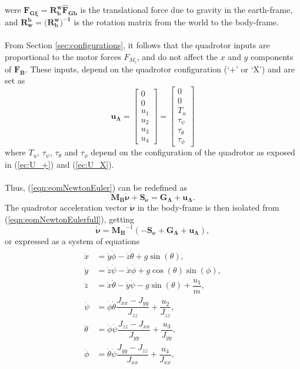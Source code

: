 were $\mathbf{F_{G\xi}}=\mathbf{R_{b}^{w}}\mathbf{\hat{F}_{Gb}}$ is the translational force due to  gravity in the earth-frame, and $\mathbf{R_{w}^{b}} = (\mathbf{R_{b}^{w})^{-1}}$ is the rotation matrix from the world to the body-frame.
\\\\
From Section \ref{sec:configurations}, it follows that the quadrotor inputs are proportional to the motor forces $F_{M_i}$, and do not affect the $x$ and $y$ components of $\mathbf{F_B}$. These inputs, depend on the quadrotor configuration (`+' or `X') and are set as
\begin{equation}
\mathbf{u_{\Lambda}} = \begin{bmatrix}
0 \\[5pt] 0 \\[5pt] u_1 \\[5pt] u_2 \\[5pt] u_3 \\[5pt] u_4
\end{bmatrix} = \begin{bmatrix}
0 \\[5pt] 0 \\[5pt] T_u\\[5pt]
	\tau_{\psi}\\[5pt]
	\tau_{\theta}\\[5pt]
	\tau_{\phi}
\end{bmatrix}
\end{equation}
where $T_u$, $\tau_\psi$, $\tau_\theta$ and $\tau_\phi$ depend on the configuration of the quadrotor as exposed in (\ref{ec:U_+}) and (\ref{ec:U_X}).
\\\\
Thus, (\ref{eqn:eomNewtonEuler}) can be redefined as
\begin{equation}
\label{eqn:eomNewtonEulerfull}
\mathbf{M_{B}}\mathbf{\dot{\nu}} + \mathbf{S_\nu} = \mathbf{G_{\Lambda}} + \mathbf{u_{\Lambda}}.
\end{equation}
The quadrotor acceleration vector $\mathbf{\dot{\nu}}$ in the body-frame is then isolated from (\ref{eqn:eomNewtonEulerfull}), getting
\begin{equation}
\mathbf{\dot{\nu}} = \mathbf{M_{B}}^{-1}(-\mathbf{S_\nu} + \mathbf{G_{\Lambda}} + \mathbf{u_{\Lambda}}),
\end{equation}
or expressed as a system of equations
\begin{align}
\begin{split}
\ddot{x} & = \dot{y} \dot{\phi} - \dot{z} \dot{\theta} + g \sin(\theta), \\[5pt]
\ddot{y} & = \dot{z} \dot{\psi} - \dot{x} \dot{\phi} + g \cos(\theta)\sin(\phi), \\[5pt]
\ddot{z} & = \dot{x} \dot{\theta} - \dot{y} \dot{\psi} - g \sin(\theta) + \dfrac{u_{1}}{m}, \\[5pt]
\ddot{\psi} & = \dot{\phi}\dot{\theta} \dfrac{J_{xx}-J_{yy}}{J_{zz}} + \dfrac{u_{2}}{J_{zz}}, \\[5pt]
\ddot{\theta} & = \dot{\phi} \dot{\psi}\dfrac{J_{zz}-J_{xx}}{J_{yy}} + \dfrac{u_{3}}{J_{yy}}, \\[5pt]
\ddot{\phi} & =  \dot{\theta}\dot{\psi}\dfrac{J_{yy}-J_{zz}}{J_{xx}} + \dfrac{u_{4}}{J_{xx}},
\end{split}
\end{align}
